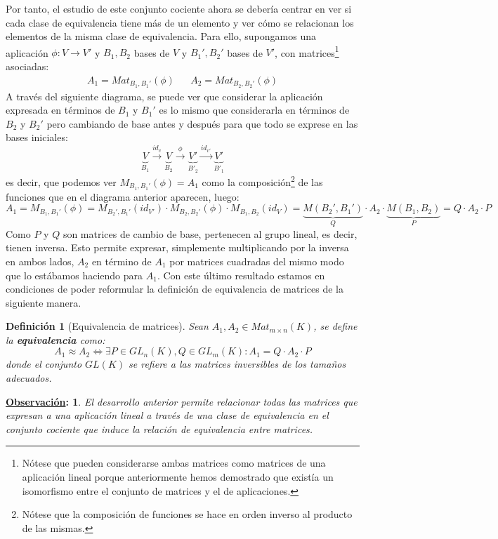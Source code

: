 \documentclass[10pt,a4paper,openright]{book}
\theoremstyle{break}
\newtheorem*{defi}{Definición}
\newtheorem*{obs}{\underline{Observación}:}
\begin{document}
Por tanto, el estudio de este conjunto cociente ahora se debería centrar en ver si cada clase de equivalencia tiene más de un elemento y ver cómo se relacionan los elementos de la misma clase de equivalencia. Para ello, supongamos una aplicación $\phi: V\longrightarrow V'$ y $B_1, B_2$ bases de $V$ y $B_1', B_2'$ bases de $V'$, con matrices\footnote{Nótese que pueden considerarse ambas matrices como matrices de una aplicación lineal porque anteriormente hemos demostrado que existía un isomorfismo entre el conjunto de matrices y el de aplicaciones.} asociadas:
\begin{align*}
A_1=Mat_{B_1,B_1'}(\phi) & & A_2=Mat_{B_2,B_2'}{}(\phi)
\end{align*}
A través del siguiente diagrama, se puede ver que considerar la aplicación expresada en términos de $B_1$ y $B_1'$ es lo mismo que considerarla en términos de $B_2$ y $B_2'$ pero cambiando de base antes y después para que todo se exprese en las bases iniciales:
$$
\underbrace{V}_{B_1}\xrightarrow{id_v} \underbrace{V}_{B_2} \xrightarrow{\phi} \underbrace{V'}_{B'_2} \xrightarrow{id_{v'}} \underbrace{V'}_{B'_1}
$$
es decir, que podemos ver $M_{B_1,B_1'}(\phi) = A_1$ como la composición\footnote{Nótese que la composición de funciones se hace en orden inverso al producto de las mismas.} de las funciones que en el diagrama anterior aparecen, luego:
$$
A_1=M_{B_1,B_1'}(\phi)=M_{B_2',B_1'}(id_{V'})\cdot M_{B_2,B_2'}(\phi)\cdot M_{B_1, B_2}(id_V)=\underbrace{M(B_2',B_1')}_{Q}\cdot A_2\cdot \underbrace{M(B_1,B_2)}_{P}=Q\cdot A_2\cdot P
$$
Como $P$ y $Q$ son matrices de cambio de base, pertenecen al grupo lineal, es decir, tienen inversa. Esto permite expresar, simplemente multiplicando por la inversa en ambos lados, $A_2$ en término de $A_1$ por matrices cuadradas del mismo modo que lo estábamos haciendo para $A_1$. Con este último resultado estamos en condiciones de poder reformular la definición de equivalencia de matrices de la siguiente manera.

\begin{defi}[Equivalencia de matrices]
Sean $A_1, A_2\in Mat_{m\times n}(K)$, se define la \textbf{equivalencia} como:
$$A_1\approx A_2 \Leftrightarrow \exists P\in GL_n(K), Q\in GL_m(K) :  A_1=Q\cdot A_2\cdot P$$
donde el conjunto $GL(K)$ se refiere a las matrices inversibles de los tamaños adecuados.
\end{defi}

\begin{obs}
El desarrollo anterior permite relacionar todas las matrices que expresan a una aplicación lineal a través de una clase de equivalencia en el conjunto cociente que induce la relación de equivalencia entre matrices.
\end{obs}
\end{document}

